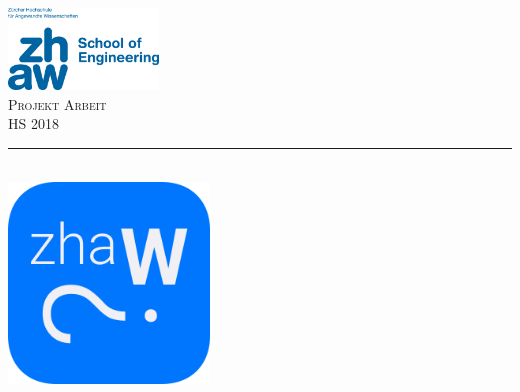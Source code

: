 
\begin{titlepage} %
	\newcommand{\HRule}{\rule{\linewidth}{0.5mm}} %

	\center %


	\includegraphics[width=0.3\textwidth, left]{../assets/zhawLogo.jpeg}\\[1cm]

	\textsc{\Large Projekt Arbeit}\\[0.5cm] %

	\textsc{\large HS 2018}\\[0.5cm] %


	\HRule\\[0.5cm]


	\includegraphics[width=0.4\textwidth]{../assets/zhawoLogo.png}\\[0.5cm]


\end{titlepage}
